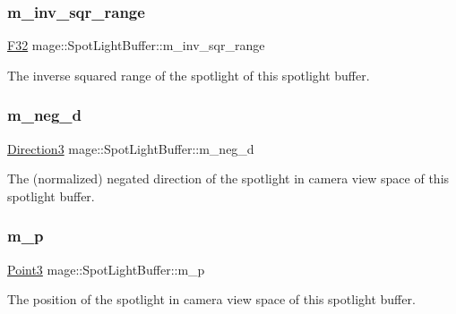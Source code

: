 \subsubsection{\texorpdfstring{m\+\_\+inv\+\_\+sqr\+\_\+range}{m\_inv\_sqr\_range}}
{\footnotesize\ttfamily \hyperlink{namespacemage_aa97e833b45f06d60a0a9c4fc22ae02c0}{F32} mage\+::\+Spot\+Light\+Buffer\+::m\+\_\+inv\+\_\+sqr\+\_\+range}

The inverse squared range of the spotlight of this spotlight buffer. \hypertarget{structmage_1_1_spot_light_buffer_ae0baddd8256464e3cdf91a766f9bf143}{}\label{structmage_1_1_spot_light_buffer_ae0baddd8256464e3cdf91a766f9bf143} 
\subsubsection{\texorpdfstring{m\+\_\+neg\+\_\+d}{m\_neg\_d}}
{\footnotesize\ttfamily \hyperlink{structmage_1_1_direction3}{Direction3} mage\+::\+Spot\+Light\+Buffer\+::m\+\_\+neg\+\_\+d}

The (normalized) negated direction of the spotlight in camera view space of this spotlight buffer. \hypertarget{structmage_1_1_spot_light_buffer_a6cb32b6089b90aa937df99bb794884e3}{}\label{structmage_1_1_spot_light_buffer_a6cb32b6089b90aa937df99bb794884e3} 
\subsubsection{\texorpdfstring{m\+\_\+p}{m\_p}}
{\footnotesize\ttfamily \hyperlink{structmage_1_1_point3}{Point3} mage\+::\+Spot\+Light\+Buffer\+::m\+\_\+p}

The position of the spotlight in camera view space of this spotlight buffer. 
